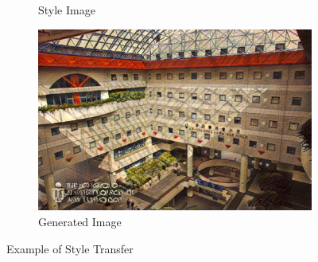 \documentclass{article}
\begin{document}
\begin{figure}[ht]
\begin{minipage}{\textwidth}
\begin{subfigure}{0.25\textwidth}
            \caption{Style Image}
        \end{subfigure}
        \hfill %
        \begin{subfigure}{0.25\textwidth}
            \includegraphics[width=\textwidth]{./part1_inference/output_14_sandro-botticelli_crucifixion(1).jpg}
            \caption{Generated Image}
        \end{subfigure}
    \end{minipage}    
    
    \caption{Example of Style Transfer}
    \label{fig:part1_inference}
\end{figure}
\end{document}
